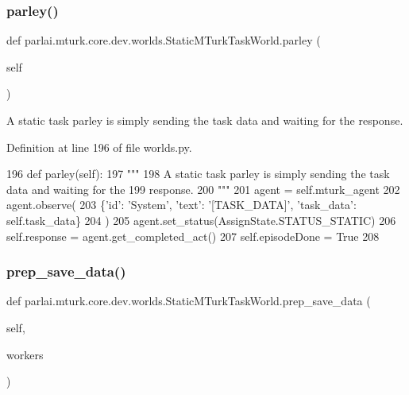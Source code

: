 \subsubsection{\texorpdfstring{parley()}{parley()}}
{\footnotesize\ttfamily def parlai.\+mturk.\+core.\+dev.\+worlds.\+Static\+M\+Turk\+Task\+World.\+parley (\begin{DoxyParamCaption}\item[{}]{self }\end{DoxyParamCaption})}

\begin{DoxyVerb}A static task parley is simply sending the task data and waiting for the
response.
\end{DoxyVerb}
 

Definition at line 196 of file worlds.\+py.


\begin{DoxyCode}
196     \textcolor{keyword}{def }parley(self):
197         \textcolor{stringliteral}{"""}
198 \textcolor{stringliteral}{        A static task parley is simply sending the task data and waiting for the}
199 \textcolor{stringliteral}{        response.}
200 \textcolor{stringliteral}{        """}
201         agent = self.mturk\_agent
202         agent.observe(
203             \{\textcolor{stringliteral}{'id'}: \textcolor{stringliteral}{'System'}, \textcolor{stringliteral}{'text'}: \textcolor{stringliteral}{'[TASK\_DATA]'}, \textcolor{stringliteral}{'task\_data'}: self.task\_data\}
204         )
205         agent.set\_status(AssignState.STATUS\_STATIC)
206         self.response = agent.get\_completed\_act()
207         self.episodeDone = \textcolor{keyword}{True}
208 
\end{DoxyCode}
\mbox{\label{classparlai_1_1mturk_1_1core_1_1dev_1_1worlds_1_1StaticMTurkTaskWorld_a5eb7b6e957de17b89a2e24c3d6fef751}} 
\subsubsection{\texorpdfstring{prep\+\_\+save\+\_\+data()}{prep\_save\_data()}}
{\footnotesize\ttfamily def parlai.\+mturk.\+core.\+dev.\+worlds.\+Static\+M\+Turk\+Task\+World.\+prep\+\_\+save\+\_\+data (\begin{DoxyParamCaption}\item[{}]{self,  }\item[{}]{workers }\end{DoxyParamCaption})}

